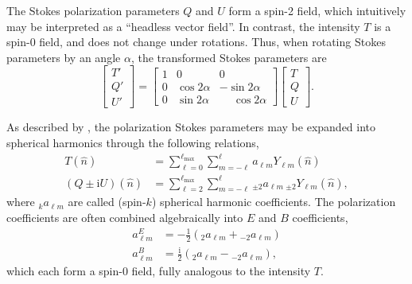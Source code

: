 \documentclass[onecolumn]{aa}
\begin{document}
The Stokes polarization parameters $Q$ and $U$ form a spin-2 field,
which intuitively may be interpreted as a ``headless vector
field''. In contrast, the intensity $T$ is a spin-0 field, and does
not change under rotations. Thus, when rotating Stokes parameters by
an angle $\alpha$, the transformed Stokes parameters are
\begin{equation}
  \left[
    \begin{array}{c}
      T' \\
      Q' \\
      U'
    \end{array}
    \right]
  =
  \left[
    \begin{array}{ccc}
      1 & 0 & 0 \\
      0 & \cos 2\alpha &  -\sin 2\alpha \\
      0 & \sin 2\alpha &  \phantom{-}\cos 2\alpha
    \end{array}
    \right]  
  \left[
    \begin{array}{c}
      T \\
      Q \\
      U
    \end{array}
    \right].
\end{equation}

As described by \citet{zaldarriaga1997}, the polarization Stokes
parameters may be expanded into spherical harmonics through the
following relations,
\begin{align}
  T(\hat{n}) &=
  \sum_{\ell=0}^{\ell_{\mathrm{max}}} \sum_{m=-\ell}^{\ell} a_{\ell m} 
  Y_{\ell m} (\hat{n})\\
  (Q\pm \mathrm iU)(\hat{n}) &=
  \sum_{\ell=2}^{\ell_{\mathrm{max}}} \sum_{m=-\ell}^{\ell} {_{\pm2}}a_{\ell m} 
    \,{_{\pm2}}Y_{\ell m} (\hat{n}),
\end{align}
where $_ka_{\ell m}$ are called (spin-$k$) spherical harmonic
coefficients. The polarization coefficients are often combined
algebraically into $E$ and $B$ coefficients,
\begin{align}
  a_{\ell m}^E &= -\frac{1}{2}\left(_{2}a_{\ell m} + {_{-2}}a_{\ell m}
  \right)\\
  a_{\ell m}^B &= \frac{\mathrm i}{2}\left(_{2}a_{\ell m} - {_{-2}}a_{\ell m} \right),
\end{align}
which each form a spin-0 field, fully analogous to the intensity
$T$.
\end{document}
